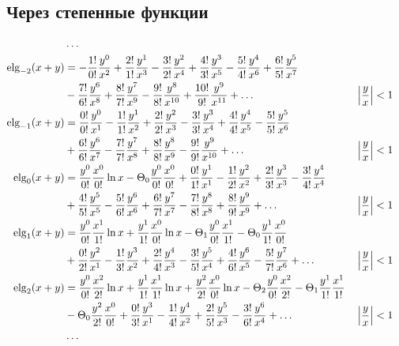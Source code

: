 
\subsection{Через степенные функции}

\begin{equation*} \begin{aligned}
&\ldots \\
%
\elg_{-2}(x + y) &= 
- \frac{1!}{0!} \frac{y^0}{x^2}
+ \frac{2!}{1!} \frac{y^1}{x^3}
- \frac{3!}{2!} \frac{y^2}{x^4}
+ \frac{4!}{3!} \frac{y^3}{x^5}
- \frac{5!}{4!} \frac{y^4}{x^6}
+ \frac{6!}{5!} \frac{y^5}{x^7} \\ &
- \frac{7!}{6!} \frac{y^6}{x^8}
+ \frac{8!}{7!} \frac{y^7}{x^9}
- \frac{9!}{8!} \frac{y^8}{x^{10}}
+ \frac{10!}{9!} \frac{y^9}{x^{11}}
+ \ldots & 
&\left| \frac{y}{x} \right| < 1 \\
%
\elg_{-1}(x + y) &=  
  \frac{0!}{0!} \frac{y^0}{x^1}
- \frac{1!}{1!} \frac{y^1}{x^2}
+ \frac{2!}{2!} \frac{y^2}{x^3}
- \frac{3!}{3!} \frac{y^3}{x^4}
+ \frac{4!}{4!} \frac{y^4}{x^5}
- \frac{5!}{5!} \frac{y^5}{x^6} \\ &
+ \frac{6!}{6!} \frac{y^6}{x^7}
- \frac{7!}{7!} \frac{y^7}{x^8}
+ \frac{8!}{8!} \frac{y^8}{x^9}
- \frac{9!}{9!} \frac{y^9}{x^{10}}
+ \ldots & 
&\left| \frac{y}{x} \right| < 1 \\
%
\elg_0(x + y) &=
  \frac{y^0}{0!} \frac{x^0}{0!} \ln{x}
- \Theta_0 \frac{y^0}{0!} \frac{x^0}{0!}
+ \frac{0!}{1!} \frac{y^1}{x^1} 
- \frac{1!}{2!} \frac{y^2}{x^2}
+ \frac{2!}{3!} \frac{y^3}{x^3}
- \frac{3!}{4!} \frac{y^4}{x^4} \\ &
+ \frac{4!}{5!} \frac{y^5}{x^5}
- \frac{5!}{6!} \frac{y^6}{x^6}
+ \frac{6!}{7!} \frac{y^7}{x^7}
- \frac{7!}{8!} \frac{y^8}{x^8}
+ \frac{8!}{9!} \frac{y^9}{x^9}
+ \ldots & 
&\left| \frac{y}{x} \right| < 1 \\
%
\elg_1(x + y) &=
  \frac{y^0}{0!} \frac{x^1}{1!} \ln{x}
+ \frac{y^1}{1!} \frac{x^0}{0!} \ln{x}
- \Theta_1 \frac{y^0}{0!} \frac{x^1}{1!}
- \Theta_0 \frac{y^1}{1!} \frac{x^0}{0!} \\ &
+ \frac{0!}{2!} \frac{y^2}{x^1}
- \frac{1!}{3!} \frac{y^3}{x^2}
+ \frac{2!}{4!} \frac{y^4}{x^3}
- \frac{3!}{5!} \frac{y^5}{x^4}
+ \frac{4!}{6!} \frac{y^6}{x^5}
- \frac{5!}{7!} \frac{y^7}{x^6}
+ \ldots & 
&\left| \frac{y}{x} \right| < 1 \\
%
\elg_2(x + y) &=
  \frac{y^0}{0!} \frac{x^2}{2!} \ln{x}
+ \frac{y^1}{1!} \frac{x^1}{1!} \ln{x}
+ \frac{y^2}{2!} \frac{x^0}{0!} \ln{x}
- \Theta_2 \frac{y^0}{0!} \frac{x^2}{2!}
- \Theta_1 \frac{y^1}{1!} \frac{x^1}{1!} \\ &
- \Theta_0 \frac{y^2}{2!} \frac{x^0}{0!}
+ \frac{0!}{3!} \frac{y^3}{x^1}
- \frac{1!}{4!} \frac{y^4}{x^2}
+ \frac{2!}{5!} \frac{y^5}{x^3}
- \frac{3!}{6!} \frac{y^6}{x^4}
+ \ldots & 
&\left| \frac{y}{x} \right| < 1 \\
%
&\ldots \\
\end{aligned} \end{equation*}
